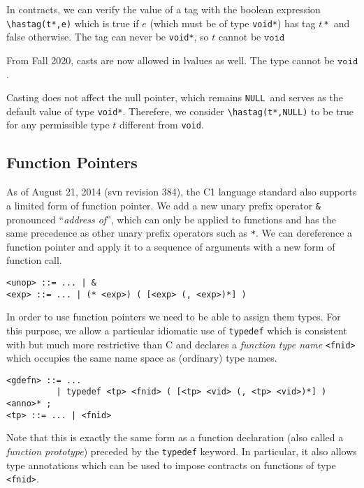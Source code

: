 \documentclass[11pt]{article}
\newcommand{\tstar}{\texttt{*}}
\newcommand{\vnull}{\texttt{NULL}}
\newcommand{\tvoid}{\texttt{void}}
\begin{document}
In contracts, we can verify the value of a tag with the boolean
expression \lstinline'\hastag(t*,e)' which is true if $e$ (which must be of
type \lstinline'void*') has tag $t$\,\tstar\ and false otherwise.
The tag can never be \lstinline'void*', so $t$ cannot be $\tvoid$

From Fall 2020, casts are now allowed in lvalues as well. The type cannot be $\tvoid$.

Casting does not affect the null pointer, which remains \vnull\ and
serves as the default value of type \lstinline'void*'.  Therefere, we
consider \lstinline'\hastag(t*,NULL)' to be true for any permissible type
$t$ different from \tvoid.

\subsection{Function Pointers}

As of August 21, 2014 (svn revision 384), the C1 language standard
also supports a limited form of function pointer.  We add a new unary
prefix operator \lstinline'&' pronounced ``\emph{address of}'', which can
only be applied to functions and has the same precedence as other
unary prefix operators such as \lstinline'*'.  We can dereference a
function pointer and apply it to a sequence of arguments with a new
form of function call.
\begin{lstlisting}[basicstyle=\smallbasicstyle]
<unop> ::= ... | &
<exp> ::= ... | (* <exp>) ( [<exp> (, <exp>)*] )
\end{lstlisting}

In order to use function pointers we need to be able to assign them
types.  For this purpose, we allow a particular idiomatic use of
\lstinline'typedef' which is consistent with but much more restrictive than
C and declares a \emph{function type name} \lstinline'<fnid>' which occupies
the same name space as (ordinary) type names.

\begin{lstlisting}[basicstyle=\smallbasicstyle]
<gdefn> ::= ...
          | typedef <tp> <fnid> ( [<tp> <vid> (, <tp> <vid>)*] ) <anno>* ;
<tp> ::= ... | <fnid>
\end{lstlisting}

Note that this is exactly the same form as a function declaration
(also called a \emph{function prototype}) preceded by the
\lstinline'typedef' keyword.  In particular, it also allows type
annotations which can be used to impose contracts on functions of type
\lstinline'<fnid>'.
\end{document}
